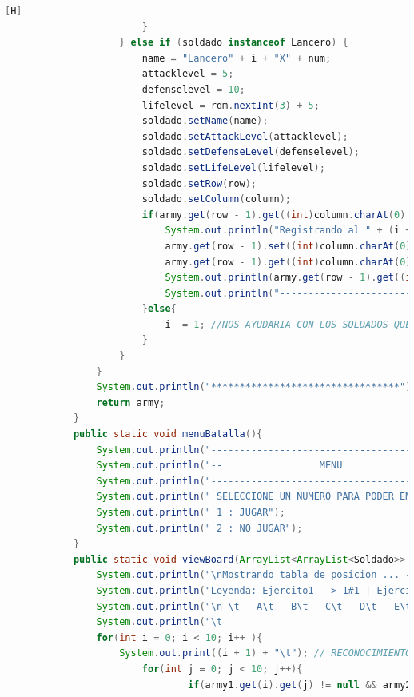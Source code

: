 \documentclass{article}
\begin{document}
\begin{lstlisting}[language=java,caption={Las lineas de codigos de la clase Mapa creada:}][H]
						}
					} else if (soldado instanceof Lancero) {
						name = "Lancero" + i + "X" + num; 
						attacklevel = 5;
						defenselevel = 10;
						lifelevel = rdm.nextInt(3) + 5;
						soldado.setName(name);                  
						soldado.setAttackLevel(attacklevel);
						soldado.setDefenseLevel(defenselevel);                    
						soldado.setLifeLevel(lifelevel);
						soldado.setRow(row);
						soldado.setColumn(column);
						if(army.get(row - 1).get((int)column.charAt(0) - 65) == null){
							System.out.println("Registrando al " + (i + 1) + " soldado del Ejercito " + armyespe + "");
							army.get(row - 1).set((int)column.charAt(0) - 65, new Lancero(name, attacklevel, defenselevel, lifelevel, speed, "Lancero", true, row, column, attacklevel));
							army.get(row - 1).get((int)column.charAt(0) - 65).setSpeed(speed);
							System.out.println(army.get(row - 1).get((int)column.charAt(0) - 65).toString());
							System.out.println("---------------------------------");
						}else{
							i -= 1; //NOS AYUDARIA CON LOS SOLDADOS QUE SE REPITEN EN EL MISMO CASILLERO CON TAL QUE NO DEBERIA CONTAR 
						}
					}
				}
				System.out.println("*********************************");
				return army;
			}
			public static void menuBatalla(){
				System.out.println("-------------------------------------------");
				System.out.println("--                 MENU                  --"); 
				System.out.println("-------------------------------------------");
				System.out.println(" SELECCIONE UN NUMERO PARA PODER EMPEZAR O TERMINAR");
				System.out.println(" 1 : JUGAR");
				System.out.println(" 2 : NO JUGAR");
			}
			public static void viewBoard(ArrayList<ArrayList<Soldado>> army1, ArrayList<ArrayList<Soldado>> army2){ //EN ESTE METODO DEMOSTRAREMOS LA TABLA REUTILIZAREMOS CODIGOS DE ANTERIORES LABORATORIOS PARA PODER HACER LA BASE DE ESTE TABLERO
				System.out.println("\nMostrando tabla de posicion ... --");
				System.out.println("Leyenda: Ejercito1 --> 1#1 | Ejercito2 --> 2#2"); //RECONOCIMIENTO PARA LOS EJERCITOS Y POSICION DE SUS SOLDADOS
				System.out.println("\n \t   A\t   B\t   C\t   D\t   E\t   F\t   G\t   H\t   I\t   J"); // RECONOCIMIENTO PARA CADA UBICACION DE CADA SOLDADO EN EL TABLERO POR PARTE DE LAS COLUMNAS
				System.out.println("\t_________________________________________________________________________________");
				for(int i = 0; i < 10; i++ ){
					System.out.print((i + 1) + "\t"); // RECONOCIMIENTO PARA CADA UBICACION DE CADA SOLDADO EN EL TABLERO POR PARTE DE LAS FILAS
						for(int j = 0; j < 10; j++){
								if(army1.get(i).get(j) != null && army2.get(i).get(j) != null){ //CREAMOS UN IF PARA QUE ESTE NOS AYUDE A SABER QUIEN DE ESTOS SOLDADOS SE OCUPARA DEL CASILLERO EL CUAL DONDE ESTAN PELEANDO

\end{lstlisting}
\end{document}
